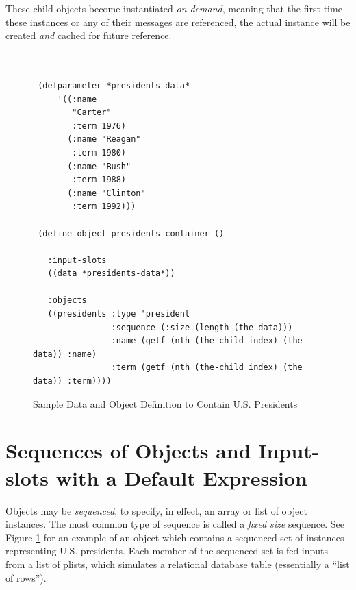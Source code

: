 \documentclass [11pt]{book}
\begin{document}
These child objects become instantiated \emph{on demand}, meaning that the first time these instances or any of their messages
are referenced, the actual instance will be created \emph{and} cached for future reference.
\begin{figure}
\begin{lrbox}{\boxedverb}
\begin{minipage}{\linewidth}

\begin{verbatim}


 (defparameter *presidents-data*
     '((:name 
        "Carter"
        :term 1976)
       (:name "Reagan"
        :term 1980)
       (:name "Bush"
        :term 1988)
       (:name "Clinton"
        :term 1992)))
       
 (define-object presidents-container ()

   :input-slots
   ((data *presidents-data*))

   :objects
   ((presidents :type 'president
                :sequence (:size (length (the data)))
                :name (getf (nth (the-child index) (the data)) :name)
                :term (getf (nth (the-child index) (the data)) :term))))

\end{verbatim}
\end{minipage}
\end{lrbox}
\fbox{\usebox{\boxedverb}}

\caption{Sample Data and Object Definition to Contain U.S. Presidents}

\label{fig:object-presidents-container}

\end{figure}


\section{Sequences of Objects and Input-slots with a Default Expression}

\label{sec:sequencesofobjectsandinput-slotswithadefaultexpression}

Objects may be \emph{sequenced}, to specify, in effect, an array or list of object instances. The most
common type of sequence is called a \emph{fixed size} sequence. See Figure 
\ref{fig:object-presidents-container} for an example of an object which contains a sequenced set of 
instances representing U.S. presidents. Each member of the sequenced set 
is fed inputs from a list of plists, which simulates a relational database 
table (essentially a ``list of rows'').
        
\end{document}
